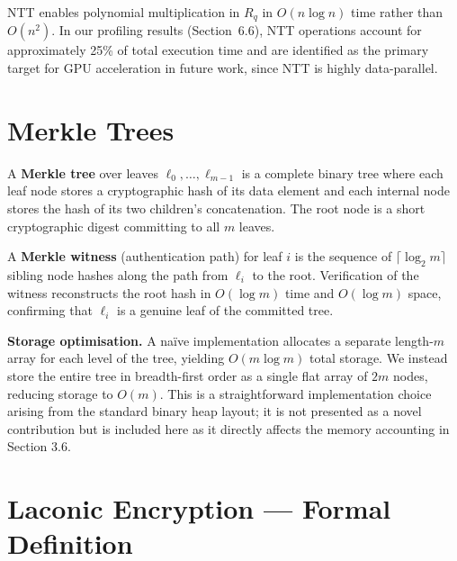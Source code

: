 NTT enables polynomial multiplication in $R_q$ in $O(n \log n)$ time rather than
$O(n^2)$. In our profiling results (Section~6.6), NTT operations account for
approximately 25\% of total execution time and are identified as the primary
target for GPU acceleration in future work, since NTT is highly data-parallel.

\section{Merkle Trees}

\begin{definition}\label{def:merkle}
A \textbf{Merkle tree} over leaves $\ell_0, \ldots, \ell_{m-1}$ is a complete
binary tree where each leaf node stores a cryptographic hash of its data element and each
internal node stores the hash of its two children's concatenation. The root node is a
short cryptographic digest committing to all $m$ leaves.
\end{definition}

\begin{definition}\label{def:witness}
A \textbf{Merkle witness} (authentication path) for leaf $i$ is the sequence of
$\lceil \log_2 m \rceil$ sibling node hashes along the path from $\ell_i$ to the
root. Verification of the witness reconstructs the root hash in $O(\log m)$ time
and $O(\log m)$ space, confirming that $\ell_i$ is a genuine leaf of the committed tree.
\end{definition}

\begin{remark}\label{rem:merkle-storage}
\textbf{Storage optimisation.} A na\"{i}ve implementation allocates a separate length-$m$
array for each level of the tree, yielding $O(m \log m)$ total storage. We instead store
the entire tree in breadth-first order as a single flat array of $2m$ nodes, reducing
storage to $O(m)$. This is a straightforward implementation choice arising from the standard
binary heap layout; it is not presented as a novel contribution but is included here
as it directly affects the memory accounting in Section 3.6.
\end{remark}

\section{Laconic Encryption --- Formal Definition}

